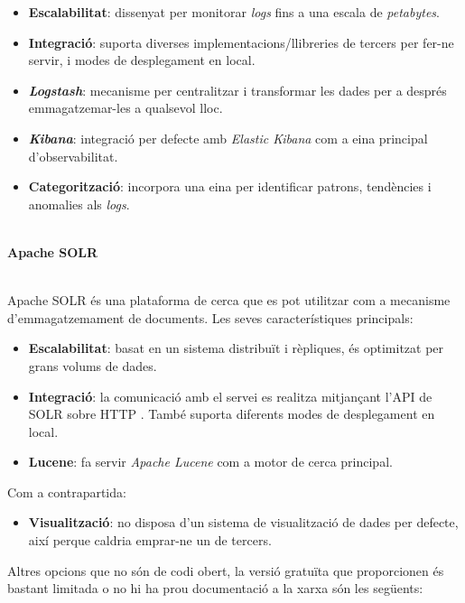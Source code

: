 \begin{itemize}
    \item \textbf{Escalabilitat}: dissenyat per monitorar \textit{\gls{log}s} fins a una escala de \textit{petabytes}.
    \item \textbf{Integració}: suporta diverses implementacions/llibreries de tercers per fer-ne servir, i modes de desplegament en local.
    \item \textbf{\textit{Logstash}}: mecanisme per centralitzar i transformar les dades per a després emmagatzemar-les a qualsevol lloc.
    \item \textbf{\textit{Kibana}}: integració per defecte amb \textit{Elastic Kibana} com a eina principal d’observabilitat.
    \item \textbf{Categorització}: incorpora una eina per identificar patrons, tendències i anomalies als \textit{\gls{log}s}.
\end{itemize}


\noindent \\
\textbf{Apache SOLR~\cite{SOLR}}

\noindent \\
Apache SOLR és una plataforma de cerca que es pot utilitzar com a mecanisme d’emmagatzemament de documents. 
Les seves característiques principals:

\begin{itemize}
    \item \textbf{Escalabilitat}: basat en un sistema distribuït i rèpliques, és optimitzat per grans volums de dades.
    \item \textbf{Integració}: la comunicació amb el servei es realitza mitjançant l’\gls{API} de SOLR sobre \gls{HTTP} .
    També suporta diferents modes de desplegament en local.
    \item \textbf{Lucene}: fa servir \textit{Apache Lucene} com a motor de cerca principal.
\end{itemize}

\noindent
Com a contrapartida:

\begin{itemize}
    \item \textbf{Visualització}: no disposa d’un sistema de visualització de dades per defecte, així perque caldria emprar-ne un de tercers.
\end{itemize}


\clearpage

\noindent
Altres opcions que no són de codi obert, la versió gratuïta que proporcionen és bastant limitada o no hi ha prou documentació a la xarxa són les següents:

